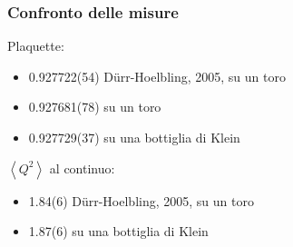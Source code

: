 \begin{frame}
    \frametitle{Confronto delle misure}
    {\color{fzjblue}Plaquette:}
    \begin{itemize}
		\item 0.927722(54) Dürr-Hoelbling, 2005, su un toro
		\item 0.927681(78) su un toro
		\item 0.927729(37) su una bottiglia di Klein
    \end{itemize}
    \vspace{0.5em}
    {\color{fzjblue}$\left<Q^2\right>$ al continuo:}
    \begin{itemize}
        \item 1.84(6) Dürr-Hoelbling, 2005, su un toro
        \item 1.87(6) su una bottiglia di Klein
    \end{itemize}
\end{frame}


